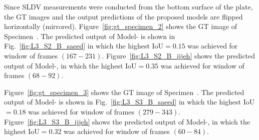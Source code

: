 \begin{sloppypar}
	Since SLDV measurements were conducted from the bottom surface of the plate, the GT images and the output predictions of the proposed models are flipped horizontally (mirrored).
	Figure~\ref{fig:gt_specimen_2} shows the GT image of Specimen~.
	The predicted output of Model- is shown in Fig.~\ref{fig:L3_S2_B_saeed} in which the highest IoU\(=0.15\) was achieved for window of frames \((167-231)\).
	Figure~\ref{fig:L3_S2_B_ijjeh} shows the predicted output of Model-, in which the highest IoU\(=0.35\) was achieved for window of frames \((68-92)\).
	
	Figure~\ref{fig:gt_specimen_3} shows the GT image of Specimen~.
	The predicted output of Model- is shown in Fig.~\ref{fig:L3_S3_B_saeed} in which the highest IoU\(=0.18\) was achieved for window of frames \((279-343)\).
	Figure~\ref{fig:L3_S3_B_ijjeh} shows the predicted output of Model-, in which the highest IoU\(=0.32\) was achieved for window of frames \((60-84)\).
	

\end{sloppypar}
